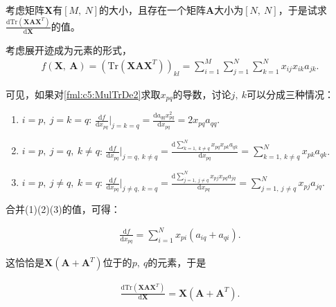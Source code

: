 \begin{example}
	考虑矩阵$\mathbf{X}$有$[M,~N]$的大小，且存在一个矩阵$\mathbf{A}$大小为$[N,~N]$，于是试求$\frac{\mathrm{d} \mathrm{Tr}(\mathbf{X} \mathbf{A} \mathbf{X}^T) }{\mathrm{d}\mathbf{X}}$的值。
	
	考虑展开迹成为元素的形式，
	\begin{equation}\label{fml:c5:MulTrDe2}
		\begin{aligned}
		 f(\mathbf{X},~\mathbf{A}) = \left( \mathrm{Tr}(\mathbf{X} \mathbf{A} \mathbf{X}^T) \right)_{kl} = \sum\limits_{i=1}^{M}{ \sum\limits_{j=1}^{N}{ \sum\limits_{k=1}^{N}{ x_{ij} x_{ik} a_{jk} } } }.
		\end{aligned}
	\end{equation}
	
	可见，如果对\eqref{fml:c5:MulTrDe2}求取$x_{pq}$的导数，讨论$j,~k$可以分成三种情况：
	
	\begin{enumerate}[label=(\arabic*)]
		\item $i=p,~j=k=q$: $\frac{\mathrm{d}f}{\mathrm{d} x_{pq}}|_{j=k=q}=\frac{\mathrm{d}a_{qq}x_{pq}^2}{\mathrm{d} x_{pq}}=2x_{pq}a_{qq}$.
		\item $i=p,~j=q,~k \neq q$: $\frac{\mathrm{d}f}{\mathrm{d} x_{pq}}|_{j=q,~k \neq q}=\frac{\mathrm{d}\sum_{k=1,~k \neq q}^N x_{pq}x_{pk}a_{qk}}{\mathrm{d} x_{pq}}=\sum_{k=1,~k \neq q}^N x_{pk}a_{qk}$.
		\item $i=p,~j \neq q,~k=q$: $\frac{\mathrm{d}f}{\mathrm{d} x_{pq}}|_{j \neq q,~k=q}=\frac{\mathrm{d}\sum_{j=1,~j \neq q}^N x_{pj}x_{pq}a_{jq}}{\mathrm{d} x_{pq}}=\sum_{j=1,~j \neq q}^N x_{pj}a_{jq}$.
	\end{enumerate}
	
	合并(1)(2)(3)的值，可得：
	
	\begin{equation}\label{fml:c5:MulTrDe3}
		\begin{aligned}
			\frac{\mathrm{d}f}{\mathrm{d} x_{pq}} = \sum_{i=1}^N x_{pi}(a_{iq} + a_{qi}).
		\end{aligned}
	\end{equation}
	
	这恰恰是$\mathbf{X}(\mathbf{A}+\mathbf{A}^T)$位于的$p,~q$的元素，于是
	
	\begin{equation}\label{fml:c5:MulTrDe3-1}
		\begin{aligned}
			\frac{\mathrm{d} \mathrm{Tr}(\mathbf{X} \mathbf{A} \mathbf{X}^T) }{\mathrm{d}\mathbf{X}} = \mathbf{X}(\mathbf{A}+\mathbf{A}^T).
		\end{aligned}
	\end{equation}
	

\end{example}

